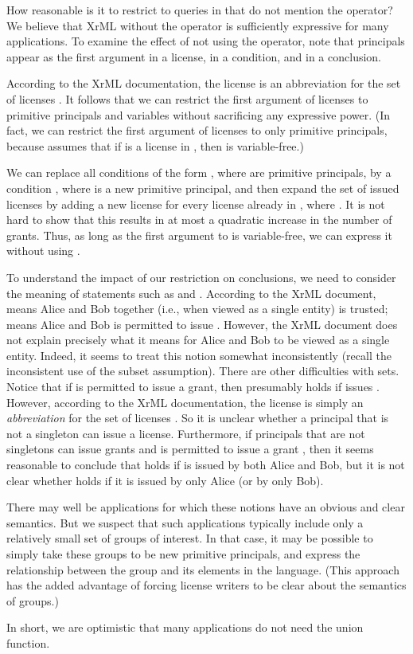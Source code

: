 \documentclass{acmtrans2m}
\newcommand{\<}{
}
\renewcommand{\>}{\rangle}
\begin{document}
How reasonable is it to restrict to queries in  that do not mention the  operator?  We
believe that XrML without the  operator is sufficiently expressive for many applications.  To
examine the effect of not using the  operator, note that principals appear as the first argument
in a license, in a  condition, and in a conclusion.
\begin{itemize}
\item According to the XrML documentation, the license  is an abbreviation for
the set of licenses .  It follows that we can restrict the
first argument of licenses to primitive principals and variables without sacrificing any expressive
power.  (In fact, we can restrict the first argument of licenses to only primitive principals, because
 assumes that if  is a license in , then  is variable-free.)
\item We
can replace all conditions of the form
, where  are primitive principals, by a condition
, where  is a new primitive principal, and then
expand the set  of issued licenses by adding a new license  for every
license  already in , where .  It is not hard to show that this
results in at most a quadratic increase in the number of grants.  Thus, as long as the first argument to
 is variable-free, we can express it without using .
\begin{sloppypar}
\item To understand the impact of our restriction on conclusions, we need to consider the meaning of
statements such as  and
.  According to the XrML document,
 means Alice and Bob together (i.e., when viewed as a single
entity) is trusted;  means Alice and Bob is permitted to issue
.  However, the XrML document does not explain precisely what it means for Alice and Bob to be viewed as
a single entity.  Indeed, it seems to treat this notion somewhat inconsistently (recall the inconsistent use
of the subset assumption).  There are other difficulties with sets.  Notice that if
 is permitted to issue a grant, then presumably  holds if
 issues .  However, according to the XrML documentation, the license
 is simply an \emph{abbreviation} for the set of licenses
.  So it is unclear whether a principal that is not a
singleton can issue a license.  Furthermore, if principals that are not singletons can issue grants and
 is permitted to issue a grant , then it seems reasonable to conclude
that  holds if  is issued by both Alice and Bob, but it is not clear whether  holds if it is issued
by only Alice (or by only Bob).
\end{sloppypar}

There may well be applications for which these notions have an obvious and
clear semantics.  But we suspect that such applications typically include
only a relatively small set of groups of interest.
In that case, it may be possible to simply take these groups
to be new primitive principals, and express the relationship between the
group and its elements in the language.  (This approach has the added
advantage of forcing license writers to be clear about the semantics of
groups.)
\end{itemize}
In short, we are optimistic that many applications do not need the union function.
\end{document}

